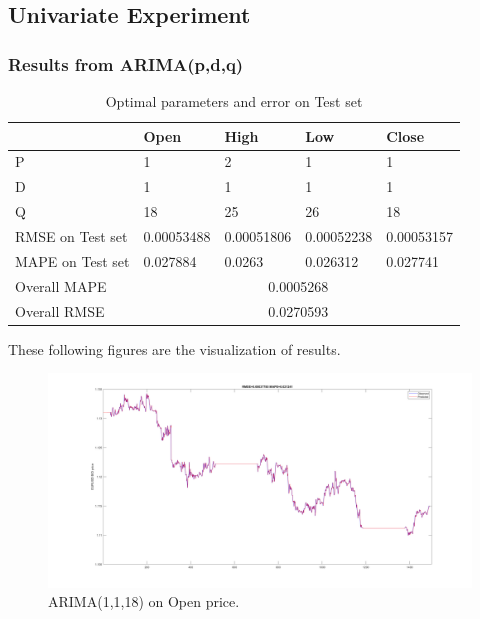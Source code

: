 \documentclass[11pt]{article}
\begin{document}
\subsection{Univariate Experiment}
\subsubsection{Results from ARIMA(p,d,q)}

\begin{table}[H]
  \centering
\begin{tabular}{|l|l|l|l|l|}
  \hline
  & Open        & High       & Low        & Close      \\ \hline
  P                & 1           & 2          & 1          & 1          \\ \hline
  D                & 1           & 1          & 1          & 1          \\ \hline
  Q                & 18          & 25         & 26         & 18         \\ \hline
  RMSE on Test set & 0.00053488  & 0.00051806 & 0.00052238 & 0.00053157 \\ \hline
  MAPE on Test set & 0.027884    & 0.0263     & 0.026312   & 0.027741   \\ \hline
  Overall MAPE     & \multicolumn{4}{c|}{0.0005268}                   \\ \hline
  Overall RMSE     & \multicolumn{4}{c|}{0.0270593}                      \\ \hline
\end{tabular}
\caption{Optimal parameters and error on Test set}
\end{table}
These following figures are the visualization of results.
\begin{figure}[H]
  \centering
  \includegraphics[width=\textwidth,keepaspectratio]{figs/arima_1_1_18_open.png}
  \caption{ARIMA(1,1,18) on Open price.}
\end{figure}
\end{document}
